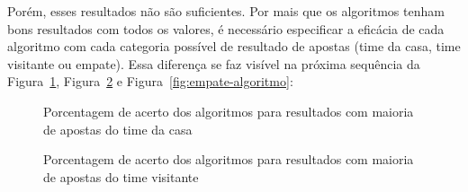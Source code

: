 \documentclass[thesis]{hmcposter}
\begin{document}
\begin{poster}
Porém, esses resultados não são suficientes. Por mais que os algoritmos tenham bons resultados com todos os valores, é necessário especificar a eficácia de cada algoritmo com cada categoria possível de resultado de apostas (time da casa, time visitante ou empate). Essa diferença se faz visível na próxima sequência da Figura~\ref{fig:casa-algoritmo}, Figura~\ref{fig:visitante-algoritmo} e Figura~\ref{fig:empate-algoritmo}:

\begin{figure}
\begin{center}
\caption{Porcentagem de acerto dos algoritmos para resultados com maioria de apostas do time da casa}%
\label{fig:casa-algoritmo}
\end{center}
\end{figure}

\begin{figure}
\begin{center}
\caption{Porcentagem de acerto dos algoritmos para resultados com maioria de apostas do time visitante}%
\label{fig:visitante-algoritmo}
\end{center}
\end{figure}


\end{poster}
\end{document}

